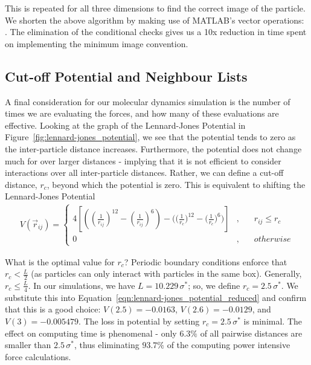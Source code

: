 \documentclass[../Main.tex]{subfiles}
\begin{document}
This is repeated for all three dimensions to find the correct image of the particle.
We shorten the above algorithm by making use of MATLAB's vector operations: . The elimination of the conditional checks gives us a 10x reduction in time spent on implementing the minimum image convention.

\subsection{Cut-off Potential and Neighbour Lists}

A final consideration for our molecular dynamics simulation is the number of times we are evaluating the forces, and how many of these evaluations are effective. Looking at the graph of the Lennard-Jones Potential in Figure~\ref{fig:lennard-jones_potential}, we see that the potential tends to zero as the inter-particle distance increases. Furthermore, the potential does not change much for over larger distances - implying that it is not efficient to consider interactions over all inter-particle distances. Rather, we can define a cut-off distance, $r_{c}$, beyond which the potential is zero. This is equivalent to shifting the Lennard-Jones Potential
\begin{align}
	V\left(\vec{r}_{ij}\right) = \left\{
		\begin{array}{lll}
			4 \left[ \left(\left( \frac{1}{r_{ij}}\right)^{12} - \left( \frac{1}{r_{ij}}\right)^{6}\right) - \Bigg(\bigg( \frac{1}{r_{c}}\bigg)^{12} - \bigg( \frac{1}{r_{c}}\bigg)^{6}\Bigg) \right] &, & \quad r_{ij} \leq r_{c} \\
			0&, & \quad otherwise 
		\end{array} \label{eqn:lennard-jones_potential_reduced_shifted}
	\right.
\end{align}

What is the optimal value for $r_{c}$? Periodic boundary conditions enforce that $r_{c} < \frac{L}{2}$ (as particles can only interact with particles in the same box). Generally, $r_{c} \leq \frac{L}{4}$\cite{FrenkelSmit2001}. In our simulations, we have $L = 10.229\,\sigma^{*}$; so, we define $r_{c} = 2.5\,\sigma^{*}$. We substitute this into Equation~\ref{eqn:lennard-jones_potential_reduced} and confirm that this is a good choice: $V(2.5) = -0.0163$, $V(2.6) = -0.0129$, and $V(3) = -0.005479$. The  loss in potential by setting $r_{c} = 2.5\,\sigma^{*}$ is minimal. The effect on computing time is phenomenal - only $6.3\%$ of all pairwise distances are smaller than $2.5\,\sigma^{*}$, thus eliminating $93.7\%$ of the computing power intensive force calculations.
\end{document}
